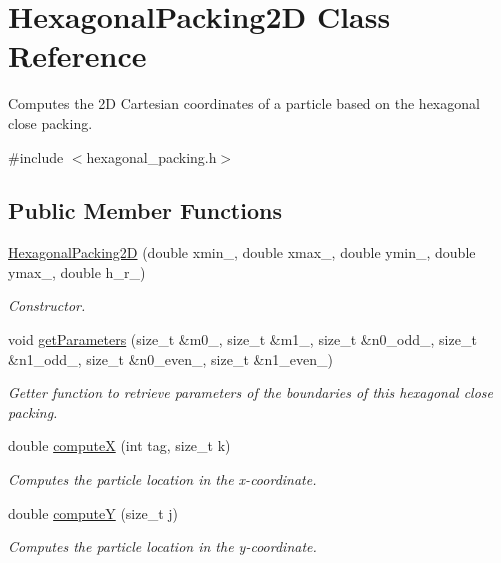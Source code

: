 \hypertarget{classHexagonalPacking2D}{\section{Hexagonal\-Packing2\-D Class Reference}
\label{classHexagonalPacking2D}
}


Computes the 2\-D Cartesian coordinates of a particle based on the hexagonal close packing.  




{\ttfamily \#include $<$hexagonal\-\_\-packing.\-h$>$}

\subsection*{Public Member Functions}
\begin{DoxyCompactItemize}
\item 
\hyperlink{classHexagonalPacking2D_a30a98a87fee5e3e7860b3d6d0574818d}{Hexagonal\-Packing2\-D} (double xmin\-\_\-, double xmax\-\_\-, double ymin\-\_\-, double ymax\-\_\-, double h\-\_\-r\-\_\-)
\begin{DoxyCompactList}\small\item\em Constructor. \end{DoxyCompactList}\item 
void \hyperlink{classHexagonalPacking2D_a96f97316b2bf376799ec1034564c1939}{get\-Parameters} (size\-\_\-t \&m0\-\_\-, size\-\_\-t \&m1\-\_\-, size\-\_\-t \&n0\-\_\-odd\-\_\-, size\-\_\-t \&n1\-\_\-odd\-\_\-, size\-\_\-t \&n0\-\_\-even\-\_\-, size\-\_\-t \&n1\-\_\-even\-\_\-)
\begin{DoxyCompactList}\small\item\em Getter function to retrieve parameters of the boundaries of this hexagonal close packing. \end{DoxyCompactList}\item 
double \hyperlink{classHexagonalPacking2D_a6c31980fa7a6c59049c3b4880378b79e}{compute\-X} (int tag, size\-\_\-t k)
\begin{DoxyCompactList}\small\item\em Computes the particle location in the x-\/coordinate. \end{DoxyCompactList}\item 
double \hyperlink{classHexagonalPacking2D_a3dac0ac04d6757570588e7ad7273f966}{compute\-Y} (size\-\_\-t j)
\begin{DoxyCompactList}\small\item\em Computes the particle location in the y-\/coordinate. \end{DoxyCompactList}\end{DoxyCompactItemize}


